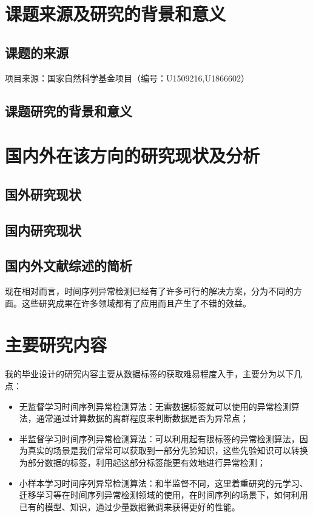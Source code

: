 \section{课题来源及研究的背景和意义}

\subsection{课题的来源}

项目来源：国家自然科学基金项目（编号：U1509216,U1866602）

\subsection{课题研究的背景和意义}



\section{国内外在该方向的研究现状及分析}

\subsection{国外研究现状}

\subsection{国内研究现状}


\subsection{国内外文献综述的简析}

现在相对而言，时间序列异常检测已经有了许多可行的解决方案，分为不同的方面。这些研究成果在许多领域都有了应用而且产生了不错的效益。

\section{主要研究内容}

我的毕业设计的研究内容主要从数据标签的获取难易程度入手，主要分为以下几点：

\begin{itemize}
    \item 无监督学习时间序列异常检测算法：无需数据标签就可以使用的异常检测算法，通常通过计算数据的离群程度来判断数据是否为异常点；
    \item 半监督学习时间序列异常检测算法：可以利用起有限标签的异常检测算法，因为真实的场景是我们常常可以获取到一部分先验知识，这些先验知识可以转换为部分数据的标签，利用起这部分标签能更有效地进行异常检测；
    \item 小样本学习时间序列异常检测算法：和半监督不同，这里着重研究的元学习、迁移学习等在时间序列异常检测领域的使用，在时间序列的场景下，如何利用已有的模型、知识，通过少量数据微调来获得更好的性能。
\end{itemize}

